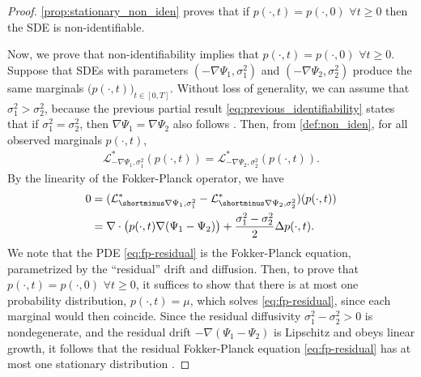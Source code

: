 \documentclass[twoside]{article}
\begin{document}
\begin{proof}
\cref{prop:stationary_non_iden} proves that if $p(\cdot, t)=p(\cdot, 0)$ $\forall t \ge 0$ then the SDE is non-identifiable.

Now, we prove that non-identifiability implies that $p(\cdot, t)=p(\cdot, 0)$ $\forall t \ge 0$. Suppose that SDEs with parameters $(-\nabla \Psi_1, \sigma_1^2)$ and $(-\nabla \Psi_2, \sigma_2^2)$ produce the same marginals $\bigl(p(\cdot, t)\bigr)_{t \in [0,T]}$. Without loss of generality, we can assume that $\sigma_1^2 > \sigma_2^2$, because the previous partial result \eqref{eq:previous_identifiability} states that if $\sigma_1^2 = \sigma_2^2$, then $\nabla \Psi_1 = \nabla \Psi_2$ also follows \citep[Theorem 2.1]{lavenant2021towards}.
Then, from \cref{def:non_iden}, for all observed marginals $p(\cdot,t)$, 
\begin{align}
    \mathcal{L}^*_{-\nabla\Psi_1,\sigma_1^2}(p(\cdot,t))
    =
    \mathcal{L}^*_{-\nabla\Psi_2,\sigma_2^2}(p(\cdot,t)).
\end{align}
By the linearity of the Fokker-Planck operator, we have
\begin{align}
    0
    &=
    (\mathcal{L}^*_{\shortminus\nabla\Psi_1, \sigma_1^2}- \mathcal{L}^*_{\shortminus\nabla\Psi_2, \sigma_2^2})(p(\cdot, t))\\
    &=
    \nabla \cdot \bigl(p(\cdot, t)\nabla (\Psi_1-\Psi_2) \bigr) + \frac{\sigma_1^2-\sigma_2^2}{2}\Delta p(\cdot, t).
    \label{eq:fp-residual}
\end{align}
We note that the PDE \eqref{eq:fp-residual} is the Fokker-Planck equation, parametrized by the ``residual'' drift and diffusion. Then, to prove that $p(\cdot, t) = p(\cdot, 0)$ $\forall t \ge 0$, it suffices to show that there is at most one probability distribution, $p(\cdot, t) = \mu$, which solves \eqref{eq:fp-residual}, since each marginal would then coincide. Since the residual diffusivity $\sigma_1^2-\sigma_2^2>0$ is nondegenerate, and the residual drift $-\nabla (\Psi_1 -\Psi_2)$ is Lipschitz and obeys linear growth, it follows that the residual Fokker-Planck equation \eqref{eq:fp-residual} has at most one stationary distribution \citep[Theorem 4.1.6, Example 4.1.8]{bogachev2022fokker}.
\end{proof}
\end{document}
